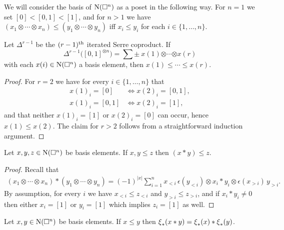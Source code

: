 We will consider the basis of $\operatorname{N}(\square^n)$ as a poset in the following way.
For $n = 1$ we set $[0] < [0,1] < [1]$, and for $n > 1$ we have $(x_1 \otimes \cdots \otimes x_n) \leq (y_1 \otimes \cdots \otimes y_n)$ iff $x_i \leq y_i$ for each $i \in \{1, \dots, n\}$.

\begin{lemma}
	Let $\Delta^{r-1}$ be the $(r-1)^{\mathrm{th}}$ iterated Serre coproduct.
	If
	\[
	\Delta^{r-1} \big([0,1]^{\otimes n}\big) =
	\sum \pm \ x{(1)} \bm{\otimes} \cdots \bm{\otimes} x{(r)}
	\]
	with each $x(i) \in \operatorname{N}(\square^n)$ a basis element, then $x{(1)} \leq \cdots \leq x{(r)}$.
\end{lemma}

\begin{proof}
	For $r = 2$ we have for every $i \in \{1, \dots, n\}$ that
	\begin{align*}
	x(1)_i = [0]   & \iff x(2)_i = [0,1], \\
	x(1)_i = [0,1] & \iff x(2)_i = [1],
	\end{align*}
	and that neither $x(1)_i = [1]$ or $x(2)_i = [0]$ can occur, hence $x(1) \leq x(2)$.
	The claim for $r > 2$ follows from a straightforward induction argument.
\end{proof}

\begin{lemma}
	Let $x, y, z \in \operatorname{N}(\square^n)$ be basis elements.
	If $x, y \leq z$ then $(x \ast y) \leq z$.
\end{lemma}

\begin{proof}
	Recall that
	\begin{align*}
	(x_1 \otimes \cdots \otimes x_n) \ast (y_1 \otimes \cdots \otimes y_n) =
	(-1)^{|x|} \sum_{i=1}^n x_{<i}\, \epsilon(y_{<i}) \otimes x_i \ast y_i \otimes \epsilon(x_{>i}) \, y_{>i}.
	\end{align*}
	By assumption, for every $i$ we have $x_{<i} \leq z_{<i}$ and $y_{>i} \leq z_{>i}$, and if $x_i \ast y_i \neq 0$ then either $x_i = [1]$ or $y_i = [1]$ which implies $z_i = [1]$ as well.
\end{proof}

\begin{lemma}
	Let $x, y \in \operatorname{N}(\square^n)$ be basis elements.
	If $x \leq y$ then $\operatorname{\xi}_\ast(x \ast y) = \operatorname{\xi}_\ast(x) \ast \operatorname{\xi}_\ast(y)$.
\end{lemma}

